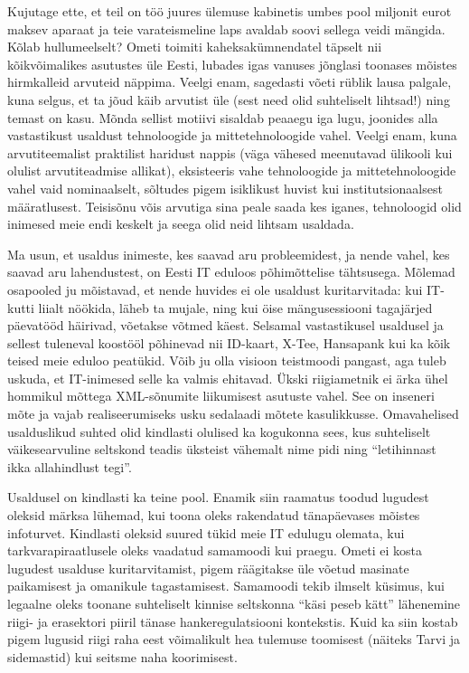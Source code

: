 Kujutage ette, et teil on töö juures ülemuse kabinetis umbes pool 
miljonit eurot maksev aparaat ja teie varateismeline laps avaldab soovi sellega 
veidi mängida. Kõlab hullumeelselt? Ometi toimiti kaheksakümnendatel 
täpselt nii kõikvõimalikes asutustes üle Eesti, lubades igas vanuses jõnglasi 
toonases mõistes hirmkalleid arvuteid näppima. Veelgi enam, sagedasti võeti 
rüblik lausa palgale, kuna selgus, et ta jõud käib arvutist üle (sest need 
olid suhteliselt lihtsad!) ning temast on kasu. Mõnda sellist motiivi sisaldab 
peaaegu iga lugu, joonides alla vastastikust usaldust tehnoloogide ja 
mittetehnoloogide vahel. Veelgi enam, kuna arvutiteemalist praktilist haridust 
nappis (väga vähesed meenutavad ülikooli kui olulist arvutiteadmise 
allikat), eksisteeris vahe tehnoloogide ja mittetehnoloogide vahel vaid 
nominaalselt, sõltudes pigem isiklikust huvist kui institutsionaalsest 
määratlusest. Teisisõnu võis arvutiga sina peale saada kes iganes, tehnoloogid olid 
inimesed meie endi keskelt ja seega olid neid lihtsam usaldada.

Ma usun, et usaldus inimeste, kes saavad aru probleemidest, ja 
nende vahel, kes saavad aru lahendustest, on Eesti IT eduloos põhimõttelise 
tähtsusega. Mõlemad osapooled ju mõistavad, et nende huvides ei ole usaldust 
kuritarvitada: kui IT-kutti liialt nöökida, läheb ta mujale, ning kui öise 
mängusessiooni tagajärjed päevatööd häirivad, võetakse võtmed käest. Selsamal 
vastastikusel usaldusel ja sellest tuleneval koostööl põhinevad nii ID-kaart, X-Tee, Hansapank kui ka kõik teised meie eduloo peatükid. Võib ju olla 
visioon teistmoodi pangast, aga tuleb uskuda, et IT-inimesed selle ka valmis 
ehitavad. Ükski riigiametnik ei ärka ühel hommikul mõttega XML-sõnumite 
liikumisest asutuste vahel. See on inseneri mõte ja vajab realiseerumiseks usku 
sedalaadi mõtete kasulikkusse. Omavahelised usalduslikud suhted olid kindlasti 
olulised ka kogukonna sees, kus suhteliselt väikesearvuline seltskond teadis üksteist 
vähemalt nime pidi ning \enquote{letihinnast ikka allahindlust tegi}. 

Usaldusel on kindlasti ka teine pool. Enamik siin raamatus toodud lugudest 
oleksid märksa lühemad, kui toona oleks rakendatud tänapäevases mõistes 
infoturvet. Kindlasti oleksid suured tükid meie IT edulugu olemata, kui 
tarkvarapiraatlusele oleks vaadatud samamoodi kui praegu. Ometi ei kosta 
lugudest usalduse kuritarvitamist, pigem räägitakse üle võetud masinate 
paikamisest ja omanikule tagastamisest. Samamoodi tekib ilmselt küsimus, kui 
legaalne oleks toonane suhteliselt kinnise seltskonna \enquote{käsi peseb kätt} 
lähenemine riigi- ja erasektori piiril tänase hankeregulatsiooni kontekstis. 
Kuid ka siin kostab pigem lugusid riigi raha eest võimalikult hea tulemuse 
toomisest (näiteks Tarvi ja sidemastid) kui seitsme naha koorimisest. 


